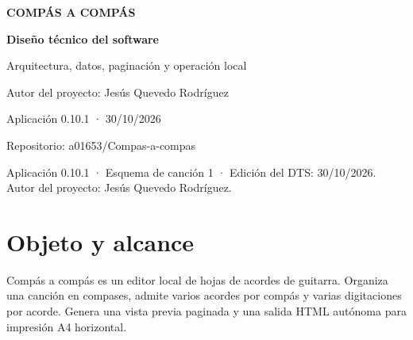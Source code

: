 \documentclass[a4paper,11pt]{article}
\begin{document}
\begin{titlepage}
\thispagestyle{empty}
\pagecolor{navybg}
\color{white}
\vspace*{3cm}
\begin{center}
{\sffamily\bfseries\fontsize{16}{19}\selectfont\color{amber} COMPÁS A COMPÁS\par}
\vspace{1cm}
\par
\vspace{1.4cm}
{\sffamily\bfseries\fontsize{30}{38}\selectfont Diseño técnico del software\par}
\vspace{0.8cm}
{\sffamily\fontsize{14}{20}\selectfont\color{lightblue} Arquitectura, datos, paginación y operación local\par}
\vfill
{\sffamily\small Autor del proyecto: Jesús Quevedo Rodríguez\par}
{\sffamily\small Aplicación 0.10.1 · 30/10/2026\par}
{\sffamily\small Repositorio: a01653/Compas-a-compas\par}
\vspace{2cm}
\end{center}
\end{titlepage}
\nopagecolor
\restoregeometry
\setcounter{page}{2}
\tableofcontents
\newpage
Aplicación 0.10.1 · Esquema de canción 1 · Edición del DTS: 30/10/2026.
Autor del proyecto: Jesús Quevedo Rodríguez.

\Needspace{3.5cm}
\section{Objeto y alcance}\label{objeto-y-alcance}

Compás a compás es un editor local de hojas de acordes de guitarra.
Organiza una canción en compases, admite varios acordes por compás y
varias digitaciones por acorde. Genera una vista previa paginada y una
salida HTML autónoma para impresión A4 horizontal.
\end{document}
